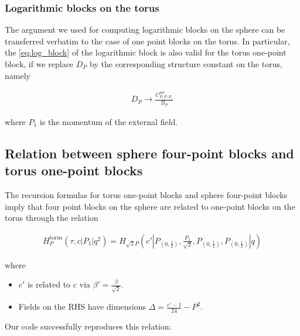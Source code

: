 \documentclass[a4paper]{article}
\numberwithin{equation}{section}
\begin{document}
\subsubsection*{Logarithmic blocks on the torus}
\label{sec:org0ffb68a}

The argument we used for computing logarithmic blocks on the sphere can be transferred verbatim to the case of one point blocks on the torus. In particular, the \ref{eq:log_block} of the logarithmic block is also valid for the torus one-point block, if we replace \(D_P\) by the corresponding structure constant on the torus, namely

\begin{align}
  D_{P} \to \frac{C^{\text{ref}}_{P,P, P_1}}{B_{P}}
\end{align}

where \(P_1\) is the momentum of the external field.
\subsection{Relation between sphere four-point blocks and torus one-point blocks}
\label{sec:orgceef356}
The recursion formulas for torus one-point blocks and sphere four-point blocks imply that four point blocks on the sphere are related to one-point blocks on the torus through the relation

\begin{align}
H^{\text{torus}}_{P}(\tau, c | P_{1} | q^{2}) = H_{\sqrt{2}P}\left(c' \left|\left. P_{(0,\frac12)}, \frac{P_{1}}{\sqrt{2}}, P_{(0,\frac12)}, P_{(0,\frac12)} \right.\right| q \right)
\end{align}

where
\begin{itemize}
\item \(c'\) is related to \(c\) via \(\beta'=\frac\beta{\sqrt 2}\).
\item Fields on the RHS have dimensions \(\Delta = \frac{c'-1}{24} - P^2\).
\end{itemize}

Our code successfully reproduces this relation:
\end{document}
